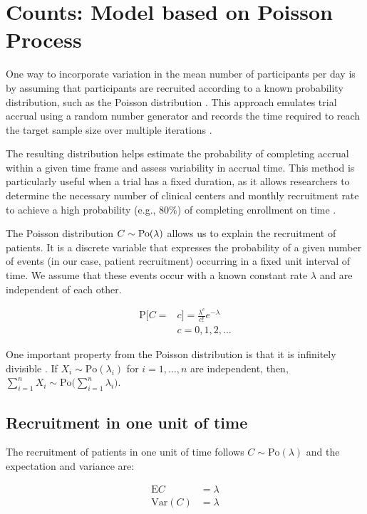 \section{Counts: Model based on Poisson Process}

One way to incorporate variation in the mean number of participants per day is by assuming that participants are recruited according to a known probability distribution, such as the Poisson distribution \citep{carter2004application}. This approach emulates trial accrual using a random number generator and records the time required to reach the target sample size over multiple iterations \citep{carter2005practical}. 

The resulting distribution helps estimate the probability of completing accrual within a given time frame and assess variability in accrual time. This method is particularly useful when a trial has a fixed duration, as it allows researchers to determine the necessary number of clinical centers and monthly recruitment rate to achieve a high probability (e.g., 80\%) of completing enrollment on time \citep{carter2005practical}.

The Poisson distribution $C\sim \rm{Po} (\lambda)$ allows us to explain the recruitment of patients. It is a discrete variable that expresses the probability of a given number of events (in our case, patient recruitment) occurring in a fixed unit interval of time. We assume that these events occur with a known constant rate $\lambda$ and are independent of each other.

\begin{align*}
\textrm{P}[C=&c] = \frac{\lambda^c}{c!}e^{-\lambda} \\
&c = 0,1,2,\ldots
\end{align*}


One important property from the Poisson distribution is that it is infinitely divisible \citep{held2014applied}. If $X_i\sim \textrm{Po} (\lambda_i)$ for $i=1,\ldots, n$ are independent, then, $\sum_{i=1}^n X_i \sim \textrm{Po} \Big( \sum_{i=1}^n \lambda_i \Big)$.

\subsection{Recruitment in one unit of time}

The recruitment of patients in one unit of time follows $C\sim \textrm{Po} (\lambda)$ and the expectation and variance are:

\begin{align*}
\textrm{E}C & = \lambda \\
\textrm{Var}(C) & = \lambda
\end{align*}

